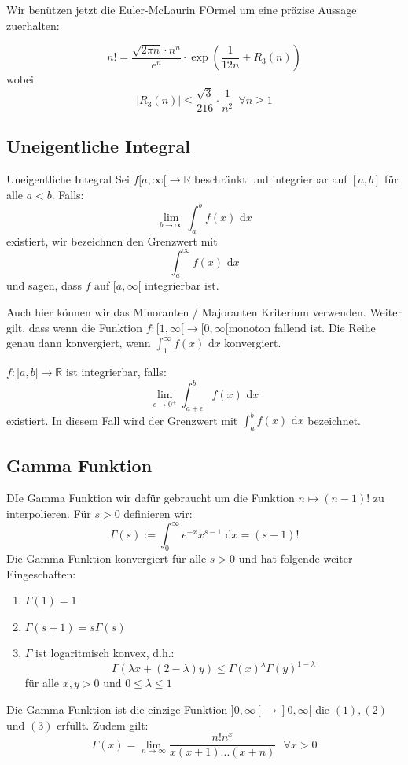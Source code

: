 \documentclass[a4paper,8pt]{extarticle}
\def\limn{\lim_{n\to \infty}}
\def\R{\mathbb{R}}
\def\dx{\text{ d}x}
\begin{document}
Wir benützen jetzt die Euler-McLaurin FOrmel um eine präzise Aussage zuerhalten:
\begin{subbox}{}
  $$n! = \frac{\sqrt{2 \pi n}\cdot n^n}{e^n} \cdot \exp\left(\frac{1}{12n} + R_3(n)\right)$$ wobei $$|R_3(n)| \leq \frac{\sqrt{3}}{216} \cdot \frac{1}{n^2} \ \ \forall n \geq 1$$
\end{subbox}

\subsection{Uneigentliche Integral}
\begin{mainbox}{Uneigentliche Integral}
  Sei $f[a, \infty[ \to \R$ beschränkt und integrierbar auf $[a, b]$ für alle $a < b$. Falls: $$ \lim_{b \to \infty} \int_a^b f(x) \dx$$ existiert, wir bezeichnen den Grenzwert mit $$\int_a^\infty f(x)\dx$$ und sagen, dass $f$ auf $[a, \infty[$ integrierbar ist.
\end{mainbox}
Auch hier können wir das Minoranten / Majoranten Kriterium
verwenden. Weiter gilt, dass wenn die Funktion $f: [1, \infty[\to [0, \infty[$monoton fallend ist. Die Reihe genau dann konvergiert, wenn $\int_1^\infty f(x)\dx$ konvergiert.
\begin{mainbox}{}
  $f:]a, b] \to \R$ ist integrierbar, falls: $$\lim_{\epsilon \to 0^+} \int_{a + \epsilon}^bf(x) \dx$$ existiert. In diesem Fall wird der Grenzwert mit $\int_a^b f(x)\dx$ bezeichnet.
\end{mainbox}

\subsection{Gamma Funktion}
DIe Gamma Funktion wir dafür gebraucht um die Funktion $n \mapsto (n-1)!$ zu interpolieren. Für $s > 0$ definieren wir: $$\Gamma(s) := \int_0^\infty e^{-x}x^{s-1}\dx = (s-1)!$$
Die Gamma Funktion konvergiert für alle $s > 0$ und hat folgende weiter Eingeschaften:
\begin{enumerate}
  \item $\Gamma(1) = 1$
  \item $\Gamma(s + 1) = s \Gamma(s)$
  \item $\Gamma$ ist logaritmisch konvex, d.h.: $$\Gamma(\lambda x + (2 - \lambda)y) \leq \Gamma(x)^\lambda \Gamma(y)^{1 - \lambda}$$ für alle $x, y > 0$ und $0 \leq \lambda \leq 1$
\end{enumerate}
Die Gamma Funktion ist die einzige Funktion $]0, \infty[ \to ]0, \infty[$ die $(1), (2)$ und $(3)$ erfüllt. Zudem gilt: $$\Gamma(x) = \limn \frac{n!n^x}{x(x+1)...(x+n)} \ \ \ \forall x > 0$$
\end{document}
